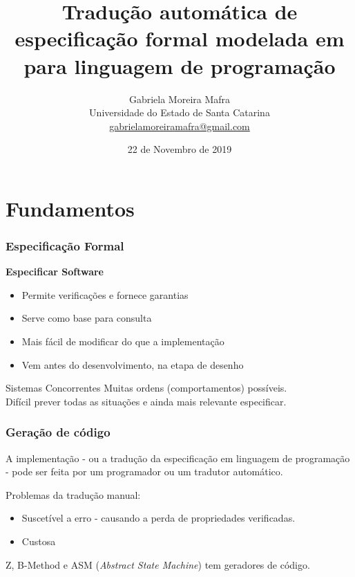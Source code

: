 \documentclass{beamer}
\title[De \TLA para linguagem de programação]{Tradução automática de especificação formal modelada em \TLA para linguagem de programação}
\author[Gabriela M. Mafra]{
    Gabriela Moreira Mafra\\\smallskip
    {\scriptsize Universidade do Estado de Santa Catarina \\\smallskip
    \vspace{-2mm}
    \url{gabrielamoreiramafra@gmail.com}}
}
\begin{document}
  \date{22 de Novembro de 2019}
  \begin{frame}
      \titlepage
  \end{frame}

\tableofcontents

\section{Fundamentos}

\begin{frame}
  \frametitle{Especificação Formal}

    \textbf{Especificar Software}
    \begin{itemize}
    \item Permite verificações e fornece garantias
    \item Serve como base para consulta
    \item Mais fácil de modificar do que a implementação
    \item Vem antes do desenvolvimento, na etapa de desenho
    \end{itemize}
    \begin{block}{Sistemas Concorrentes}
      Muitas ordens (comportamentos) possíveis.\\
      Difícil prever todas as situações e ainda mais relevante especificar.
    \end{block}
\end{frame}

\begin{frame}
  \frametitle{Geração de código}

  A implementação - ou a tradução da especificação em linguagem de programação - pode ser feita por um programador ou um tradutor automático.\medskip

  Problemas da tradução manual:
  \begin{itemize}
    \item Suscetível a erro - causando a perda de propriedades verificadas.
    \item Custosa
  \end{itemize}\medskip

  Z, B-Method e ASM (\textit{Abstract State Machine}) tem geradores de código.\medskip

\end{frame}
\end{document}
